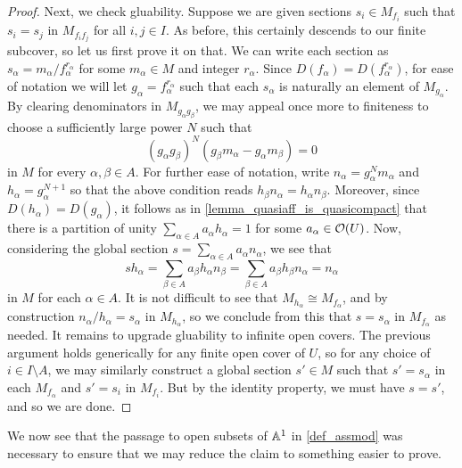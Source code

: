\begin{proof}
  Next, we check gluability.
  Suppose we are given sections $s_i \in M_{f_i}$ such that $s_i =
  s_j$ in $M_{f_i f_j}$ for all $i, j \in I$.
  As before, this certainly descends to our finite subcover, so let
  us first prove it on that.
  We can write each section as $s_\alpha =
  m_\alpha/f_\alpha^{r_\alpha}$ for some $m_\alpha \in M$ and integer
  $r_{\alpha}$.
  Since $D(f_\alpha) = D(f_\alpha^{r_\alpha})$, for ease of notation
  we will let $g_\alpha = f_\alpha^{r_\alpha}$ such that each
  $s_\alpha$ is naturally an element of $M_{g_{\alpha}}$.
  By clearing denominators in $M_{g_\alpha g_\beta}$, we may appeal
  once more to finiteness to choose a sufficiently large power $N$ such that
  \[
    (g_\alpha g_\beta)^N(g_\beta m_\alpha - g_\alpha m_\beta) = 0
  \]
  in $M$ for every $\alpha, \beta \in A$.
  For further ease of notation, write $n_\alpha = g_\alpha^N
  m_\alpha$ and $h_\alpha = g_\alpha^{N + 1}$ so that the above
  condition reads $h_\beta n_\alpha = h_\alpha n_\beta$.
  Moreover, since $D(h_\alpha) = D(g_\alpha)$, it follows as in
  \cref{lemma_quasiaff_is_quasicompact} that there is a partition of
  unity $\sum_{\alpha \in A} a_\alpha h_\alpha = 1$ for some
  $a_\alpha \in \mathcal{O}(U)$.
  Now, considering the global section $s = \sum_{\alpha \in A}
  a_\alpha n_\alpha$, we see that
  \[
    s h_\alpha
    = \sum_{\beta \in A} a_\beta h_\alpha n_\beta
    = \sum_{\beta \in A} a_\beta h_\beta n_\alpha
    = n_\alpha
  \]
  in $M$ for each $\alpha \in A$.
  It is not difficult to see that $M_{h_\alpha} \cong M_{f_\alpha}$,
  and by construction $n_\alpha/h_\alpha = s_\alpha$ in
  $M_{h_\alpha}$, so we conclude from this that $s = s_\alpha$ in
  $M_{f_\alpha}$ as needed.
  It remains to upgrade gluability to infinite open covers.
  The previous argument holds generically for any finite open cover
  of $U$, so for any choice of $i \in I \setminus A$, we may
  similarly construct a global section $s' \in M$ such that $s' =
  s_\alpha$ in each $M_{f_\alpha}$ and $s' = s_i$ in $M_{f_i}$.
  But by the identity property, we must have $s = s'$, and so we are done.
\end{proof}

We now see that the passage to open subsets of $\mathbb{A}^{{1}}$ in
\cref{def_assmod} was necessary to ensure that we may reduce the
claim to something easier to prove.
